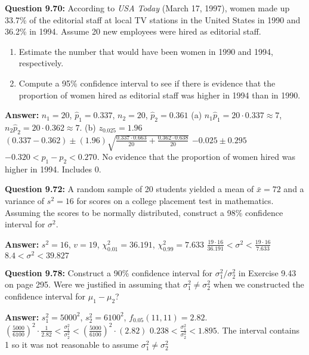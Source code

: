 \documentclass{article}
\begin{document}
\textbf{Question 9.70:}
According to \textit{USA Today} (March 17, 1997),
women made up 33.7\% of the editorial staff at local
TV stations in the United States in 1990 and 36.2\% in
1994. Assume 20 new employees were hired as editorial
staff.
\begin{enumerate}[label = (\alph*) ]
    \item Estimate the number that would have been women
    in 1990 and 1994, respectively.
    \item  Compute a 95\% confidence interval to see if there
    is evidence that the proportion of women hired as
    editorial staff was higher in 1994 than in 1990.
\end{enumerate}
\begin{description}
    \item \textbf{Answer:} $n_1=20$, $\hat{p}_1=0.337$, $n_2=20$, $\hat{p}_2=0.361$\newline
    (a) $n_1\hat{p}_1=20\cdot 0.337 \approx 7$, $n_2\hat{p}_2=20\cdot 0.362\approx 7$.\newline
    (b) $z_{0.025}=1.96$\newline
    $(0.337-0.362)\pm(1.96)\sqrt{\frac{0.337\cdot 0.663}{20}+\frac{0.362\cdot 0.638}{20}}$\newline
    $-0.025\pm 0.295$\newline
    \boldmath$-0.320<p_1-p_2<0.270$. No evidence that the proportion of women hired was higher in 1994.
    Includes 0.
\end{description}

\textbf{Question 9.72:}
A random sample of 20 students yielded a mean
of $\bar{x} = 72$ and a variance of $s^2 = 16$ for scores on a
college placement test in mathematics. Assuming the
scores to be normally distributed, construct a 98\% 
confidence interval for $\sigma^2$.
\begin{description}
    \item \textbf{Answer:} $s^2=16$, $v=19$, $\chi_{0.01}^2=36.191$, $\chi_{0.99}^2=7.633$\newline
    $\frac{19\cdot 16}{36.191} < \sigma^2 < \frac{19\cdot 16}{7.633}$\newline
    \boldmath$8.4 < \sigma^2 < 39.827$
\end{description}

\textbf{Question 9.78:}
Construct a 90\% confidence interval for $\sigma^2_1 / \sigma^2_2$ 
in Exercise 9.43 on page 295. Were we justified in assuming that 
$\sigma^2_1 \not= \sigma^2_2$ when we constructed the confidence
interval for $\mu_1 - \mu_2$?
\begin{description}
    \item \textbf{Answer:} $s_1^2=5000^2$, $s_2^2=6100^2$, $f_{0.05}(11,11)=2.82$.\newline
    $(\frac{5000}{6100})^2\cdot \frac{1}{2.82} < \frac{\sigma_1^2}{\sigma_2^2} < (\frac{5000}{6100})^2\cdot(2.82)$\newline
    \boldmath$0.238<\frac{\sigma_1^2}{\sigma_2^2}<1.895$. The interval contains 1 so it was not reasonable to assume $\sigma_1^2\not=\sigma_2^2$
\end{description}
\end{document}
